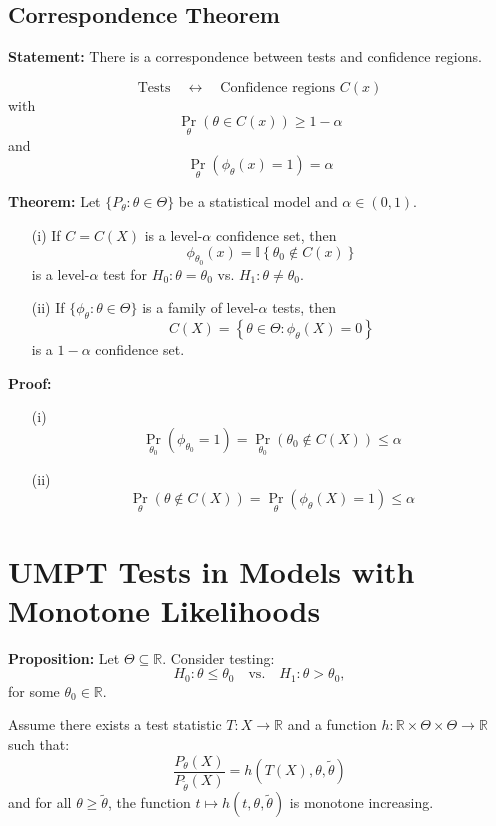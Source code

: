 \documentclass[open=any, 11pt,paper=A4]{scrreprt}
\begin{document}
\subsection*{Correspondence Theorem}

\textbf{Statement:} There is a correspondence between tests and confidence regions.

\[
\text{Tests} \quad \longleftrightarrow \quad \text{Confidence regions } C(x)
\]
with
\[
\Pr_{\theta}(\theta \in C(x)) \geq 1 - \alpha
\]
and
\[
\Pr_{\theta}(\phi_{\theta}(x) = 1) = \alpha
\]

\textbf{Theorem:} Let \( \{P_\theta : \theta \in \Theta\} \) be a statistical model and \( \alpha \in (0, 1) \).

\begin{enumerate}
    \item[(i)] If \( C = C(X) \) is a level-\(\alpha\) confidence set, then
    \[
    \phi_{\theta_0}(x) = \mathbb{I}\left\{ \theta_0 \notin C(x) \right\}
    \]
    is a level-\(\alpha\) test for \( H_0: \theta = \theta_0 \) vs. \( H_1: \theta \neq \theta_0 \).
    
    \item[(ii)] If \( \{\phi_{\theta} : \theta \in \Theta \} \) is a family of level-\(\alpha\) tests, then
    \[
    C(X) = \left\{ \theta \in \Theta : \phi_{\theta}(X) = 0 \right\}
    \]
    is a \( 1 - \alpha \) confidence set.
\end{enumerate}

\textbf{Proof:}
\begin{enumerate}
    \item[(i)] 
    \[
    \Pr_{\theta_0}(\phi_{\theta_0} = 1) = \Pr_{\theta_0}(\theta_0 \notin C(X)) \leq \alpha
    \]
    
    \item[(ii)] 
    \[
    \Pr_{\theta}(\theta \notin C(X)) = \Pr_{\theta}(\phi_{\theta}(X) = 1) \leq \alpha
    \]
\end{enumerate}

\section*{UMPT Tests in Models with Monotone Likelihoods}

\textbf{Proposition:} Let \( \Theta \subseteq \mathbb{R} \). Consider testing:
\[
H_0 : \theta \leq \theta_0 \quad \text{vs.} \quad H_1 : \theta > \theta_0,
\]
for some \( \theta_0 \in \mathbb{R} \).

Assume there exists a test statistic \( T : X \to \mathbb{R} \) and a function \( h : \mathbb{R} \times \Theta \times \Theta \to \mathbb{R} \) such that:
\[
\frac{P_{\theta}(X)}{P_{\tilde{\theta}}(X)} = h(T(X), \theta, \tilde{\theta})
\]
and for all \( \theta \geq \tilde{\theta} \), the function \( t \mapsto h(t, \theta, \tilde{\theta}) \) is monotone increasing.
\end{document}
